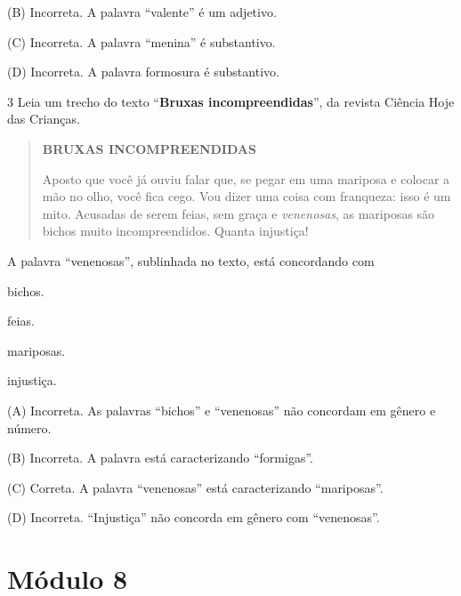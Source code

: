 \begin{escolha}
\begin{escolha}
{\begin{escolha}
(B) Incorreta. A palavra ``valente'' é um adjetivo.

(C) Incorreta. A palavra ``menina'' é substantivo.

(D) Incorreta. A palavra formosura é substantivo.

\num{3} Leia um trecho do texto ``\textbf{Bruxas incompreendidas}'',
da revista Ciência Hoje das Crianças.

\begin{quote}
\textbf{BRUXAS INCOMPREENDIDAS}

Aposto que você já ouviu falar que, se pegar em uma mariposa e colocar a
mão no olho, você fica cego. Vou dizer uma coisa com franqueza: isso é
um mito. Acusadas de serem feias, sem graça e \emph{venenosas}, as
mariposas são bichos muito incompreendidos. Quanta injustiça!
\end{quote}


A palavra ``venenosas'', sublinhada no texto, está concordando com

\begin{escolha}
\item bichos.

\item feias.

\item mariposas.

\item injustiça.
\end{escolha}


(A) Incorreta. As palavras ``bichos'' e ``venenosas'' não concordam em
gênero e número.

(B) Incorreta. A palavra está caracterizando ``formigas''.

(C) Correta. A palavra ``venenosas'' está caracterizando ``mariposas''.

(D) Incorreta. ``Injustiça'' não concorda em gênero com ``venenosas''.

\chapter{Módulo 8}


\end{escolha}}
\end{escolha}
\end{escolha}
